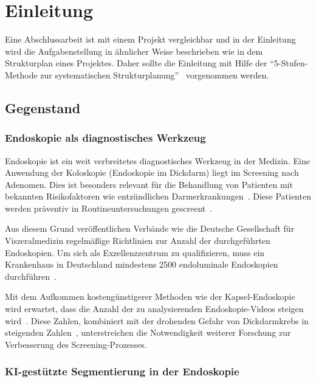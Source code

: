 \chapter{Einleitung}\label{ch:introduction}
Eine Abschlussarbeit ist mit einem Projekt vergleichbar und in der Einleitung wird die Aufgabenstellung in ähnlicher Weise beschrieben wie in dem Strukturplan eines Projektes.
Daher sollte die Einleitung mit Hilfe der \enquote{5-Stufen-Methode zur systematischen Strukturplanung}~\citep{ob}\footnotemark{} vorgenommen werden.

\section{Gegenstand}

\subsection{Endoskopie als diagnostisches Werkzeug}

Endoskopie ist ein weit verbreitetes diagnostisches Werkzeug in der Medizin. Eine Anwendung der Koloskopie (Endoskopie im Dickdarm) liegt im Screening nach Adenomen. Dies ist besonders relevant für die Behandlung von Patienten mit bekannten Risikofaktoren wie entzündlichen Darmerkrankungen~\citep{vleggaar-2007}. Diese Patienten werden präventiv in Routineuntersuchungen gescreent~\citep{arnold-2020}.

Aus diesem Grund veröffentlichen Verbände wie die Deutsche Gesellschaft für Viszeralmedizin regelmäßige Richtlinien zur Anzahl der durchgeführten Endoskopien. Um sich als Exzellenzzentrum zu qualifizieren, muss ein Krankenhaus in Deutschland mindestens 2500 endoluminale Endoskopien durchführen~\citep{dgav-ev-2015}.

Mit dem Aufkommen kostengünstigerer Methoden wie der Kapsel-Endoskopie wird erwartet, dass die Anzahl der zu analysierenden Endoskopie-Videos steigen wird~\citep{koulaouzidis-2021}. Diese Zahlen, kombiniert mit der drohenden Gefahr von Dickdarmkrebs in steigenden Zahlen~\citep{acs-2024,ferlay-2024}, unterstreichen die Notwendigkeit weiterer Forschung zur Verbesserung des Screening-Prozesses.

\subsection{KI-gestützte Segmentierung in der Endoskopie}

